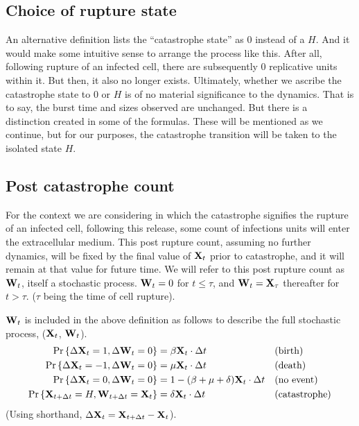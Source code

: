 \subsection*{Choice of rupture state}


An alternative definition lists the ``catastrophe state'' as 0 instead of a $H$. And it would make some intuitive sense to arrange the process like this. After all, following rupture of an infected cell, there are subsequently 0 replicative units within it. But then, it also no longer exists. Ultimately, whether we ascribe the catastrophe state to 0 or $H$ is of no material significance to the dynamics. That is to say, the burst time and sizes observed are unchanged. But there is a distinction created in some of the formulas. These will be mentioned as we continue, but for our purposes, the catastrophe transition will be taken to the isolated state $H$. \par





\subsection*{Post catastrophe count}

For the context we are considering in which the catastrophe signifies the rupture of an infected cell, following this release, some count of infections units will enter the extracellular medium. This post rupture count, assuming no further dynamics, will be fixed by the final value of ${{\bf X}_t}$ prior to catastrophe, and it will remain at that value for future time. We will refer to this post rupture count as ${{\bf W}_t}$, itself a stochastic process. ${{\bf W}_t} = 0$ for $t\leq\tau$, and ${{\bf W}_t} = {\bf X}_\tau$ thereafter for $t> \tau$. ($\tau$ being the time of cell rupture).\par
${{\bf W}_t}$ is included in the above definition as follows to describe the full stochastic process, (${{\bf X}_t}$, ${{\bf W}_t}$).
\begin{align*}
{\text{Pr}\left\{\Delta {{\bf X}_t}= 1, \Delta {{\bf W}_t}= 0\right\}} &= \beta {{\bf X}_t} \cdot \Delta t&&\text{(birth)}\\
{\text{Pr}\left\{\Delta {{\bf X}_t} = -1, \Delta {{\bf W}_t} = 0\right\}} &= \mu {{\bf X}_t}  \cdot \Delta t&&\text{(death)}\\
{\text{Pr}\left\{\Delta {{\bf X}_t} = 0, \Delta {{\bf W}_t} = 0\right\}} &=1 -  (\beta+\mu+\delta) {{\bf X}_t}  \cdot \Delta t&&\text{(no event)}\\
{\text{Pr}\left\{{\bf X}_{t+\Delta t} = H, {\bf W}_{t+\Delta t} = {\bf X}_t\right\}} &=\delta {{\bf X}_t}  \cdot \Delta t&&\text{(catastrophe)}
\end{align*}
(Using shorthand, $\Delta {{\bf X}_t} = {\bf X}_{t+\Delta t}  -  {{\bf X}_t}$).


